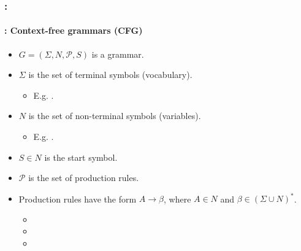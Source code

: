 \documentclass[xcolor=table]{beamer}
\begin{document}
\begin{frame}
	\frametitle{\insertshortsubtitle: \insertsection}
	\framesubtitle{\insertsubsection: Context-free grammars (CFG)}

	\begin{minipage}{.68\textwidth}
	\begin{itemize}
		\item $G = (\Sigma, N, \mathcal{P}, S)$ is a grammar.
		\item $\Sigma$ is the set of terminal symbols (vocabulary).
		\begin{itemize}
			\item E.g. .
		\end{itemize}
		\item $N$ is the set of non-terminal symbols (variables).
		\begin{itemize}
			\item E.g. .
		\end{itemize}
	\end{itemize}
	\end{minipage}
	\begin{minipage}{.3\textwidth}
	\end{minipage}
	
	\begin{itemize}
		\item $S \in N$ is the start symbol.
		\item $\mathcal{P}$ is the set of production rules.
		\item Production rules have the form $A \rightarrow \beta$, where $A \in N$ and $\beta \in (\Sigma \cup N)^*$.
		\begin{itemize}
			\item {}
			\item {}
			\item {}
		\end{itemize}
	\end{itemize}

\end{frame}
\end{document}
